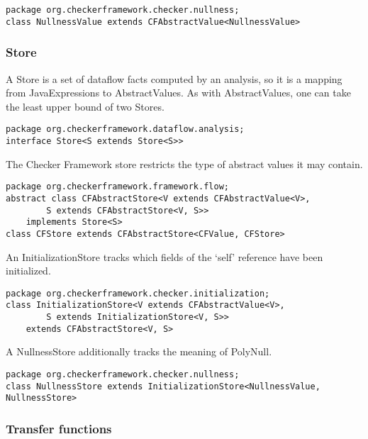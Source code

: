 \begin{verbatim}
package org.checkerframework.checker.nullness;
class NullnessValue extends CFAbstractValue<NullnessValue>
\end{verbatim}


\subsubsection{Store}
\label{sec:store_classes}

A Store is a set of dataflow facts computed by an analysis, so it is a
mapping from JavaExpressions to AbstractValues.  As with
AbstractValues, one can take the least upper bound of two Stores.

\begin{verbatim}
package org.checkerframework.dataflow.analysis;
interface Store<S extends Store<S>>
\end{verbatim}

The Checker Framework store restricts the type of abstract values it
may contain.

\begin{verbatim}
package org.checkerframework.framework.flow;
abstract class CFAbstractStore<V extends CFAbstractValue<V>,
        S extends CFAbstractStore<V, S>>
    implements Store<S>
class CFStore extends CFAbstractStore<CFValue, CFStore>
\end{verbatim}

An InitializationStore tracks which fields of the `self' reference
have been initialized.

\begin{verbatim}
package org.checkerframework.checker.initialization;
class InitializationStore<V extends CFAbstractValue<V>,
        S extends InitializationStore<V, S>>
    extends CFAbstractStore<V, S>
\end{verbatim}

A NullnessStore additionally tracks the meaning of PolyNull.

\begin{verbatim}
package org.checkerframework.checker.nullness;
class NullnessStore extends InitializationStore<NullnessValue, NullnessStore>
\end{verbatim}


\subsubsection{Transfer functions}
\label{sec:transfer_functions}


